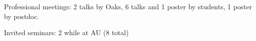 \begin{veryTightItemize}
    \item Professional meetings: 2 talks by Oaks, 6 talks and 1 poster by students, 1 poster by postdoc.
    \item Invited seminars: 2 while at AU (8 total)
\end{veryTightItemize}
